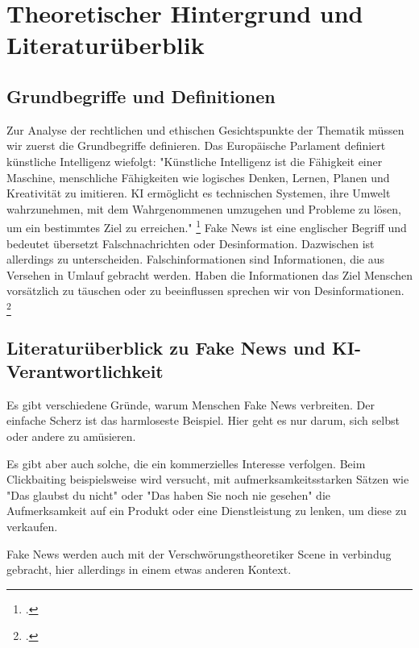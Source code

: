 \documentclass[Thesis.tex]{subfiles}
\begin{document}
\section{Theoretischer Hintergrund und Literaturüberblik}

\subsection{Grundbegriffe und Definitionen}
Zur Analyse der rechtlichen und ethischen Gesichtspunkte der Thematik müssen wir zuerst die Grundbegriffe definieren. 
Das Europäische Parlament definiert künstliche Intelligenz wiefolgt: "Künstliche Intelligenz ist die Fähigkeit einer Maschine,
 menschliche Fähigkeiten wie logisches Denken, Lernen, Planen und Kreativität zu imitieren.
KI ermöglicht es technischen Systemen, ihre Umwelt wahrzunehmen, mit dem Wahrgenommenen umzugehen
 und Probleme zu lösen, um ein bestimmtes Ziel zu erreichen." \footcite{Parlament2020}
 Fake News ist eine englischer Begriff und bedeutet übersetzt Falschnachrichten oder Desinformation. Dazwischen ist allerdings zu unterscheiden.
  Falschinformationen sind Informationen, die aus Versehen in Umlauf gebracht werden.
  Haben die Informationen das Ziel Menschen vorsätzlich zu täuschen oder zu beeinflussen sprechen wir von Desinformationen. \footcite{Bundesregierung2023Desinformation}

\subsection{Literaturüberblick zu Fake News und KI-Verantwortlichkeit}
Es gibt verschiedene Gründe, warum Menschen Fake News verbreiten. 
Der einfache Scherz ist das harmloseste Beispiel. Hier geht es nur darum, sich selbst
 oder andere zu amüsieren.

 Es gibt aber auch solche, die ein kommerzielles Interesse verfolgen. 
 Beim Clickbaiting beispielsweise wird versucht, mit aufmerksamkeitsstarken Sätzen
  wie "Das glaubst du nicht" oder "Das haben Sie noch nie gesehen" die Aufmerksamkeit
   auf ein Produkt oder eine Dienstleistung zu lenken, um diese zu verkaufen.

Fake News werden auch mit der Verschwörungstheoretiker Scene in verbindug gebracht, hier allerdings in einem etwas anderen Kontext. 
\end{document}
